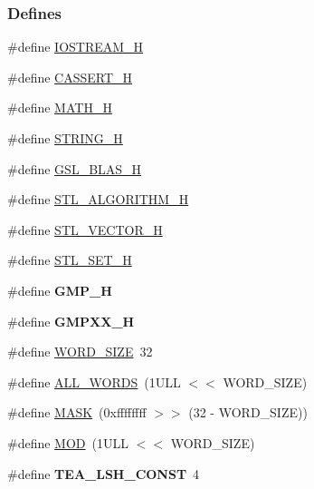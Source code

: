 \subsubsection*{\-Defines}
\begin{DoxyCompactItemize}
\item 
\#define \hyperlink{common_8hh_a438ca701b9dd1a0a50066708ccff58f9}{\-I\-O\-S\-T\-R\-E\-A\-M\-\_\-\-H}
\item 
\#define \hyperlink{common_8hh_a44300b86f203a508a89c17aa2e2c70f3}{\-C\-A\-S\-S\-E\-R\-T\-\_\-\-H}
\item 
\#define \hyperlink{common_8hh_acc195fe3f75af2725178e18f3b59ca1b}{\-M\-A\-T\-H\-\_\-\-H}
\item 
\#define \hyperlink{common_8hh_a402fe211ce26aa9a2501987dd79d1c81}{\-S\-T\-R\-I\-N\-G\-\_\-\-H}
\item 
\#define \hyperlink{common_8hh_a51650c45a5e90fb5d9808717f67bbdfc}{\-G\-S\-L\-\_\-\-B\-L\-A\-S\-\_\-\-H}
\item 
\#define \hyperlink{common_8hh_a58737f6dfc1347b3ffef3330e4b9f021}{\-S\-T\-L\-\_\-\-A\-L\-G\-O\-R\-I\-T\-H\-M\-\_\-\-H}
\item 
\#define \hyperlink{common_8hh_aaa41128916bf1510054a6b39e3be8d0c}{\-S\-T\-L\-\_\-\-V\-E\-C\-T\-O\-R\-\_\-\-H}
\item 
\#define \hyperlink{common_8hh_a419548bd7018f59158016f2a7705fe33}{\-S\-T\-L\-\_\-\-S\-E\-T\-\_\-\-H}
\item 
\hypertarget{common_8hh_aa4e25ba99abefcc6776615525b2fbc38}{\#define {\bfseries \-G\-M\-P\-\_\-\-H}}\label{common_8hh_aa4e25ba99abefcc6776615525b2fbc38}

\item 
\hypertarget{common_8hh_afd2f5d45830c97ad911a515fd5f4629b}{\#define {\bfseries \-G\-M\-P\-X\-X\-\_\-\-H}}\label{common_8hh_afd2f5d45830c97ad911a515fd5f4629b}

\item 
\#define \hyperlink{common_8hh_a92ed8507d1cd2331ad09275c5c4c1c89}{\-W\-O\-R\-D\-\_\-\-S\-I\-Z\-E}~32
\item 
\#define \hyperlink{common_8hh_a5971fc6e34c48e0046ac2df4fcb2816c}{\-A\-L\-L\-\_\-\-W\-O\-R\-D\-S}~(1\-U\-L\-L $<$$<$ W\-O\-R\-D\-\_\-\-S\-I\-Z\-E)
\item 
\#define \hyperlink{common_8hh_ae7520c5477c11965aabeedc033c9862b}{\-M\-A\-S\-K}~(0xffffffff $>$$>$ (32 -\/ W\-O\-R\-D\-\_\-\-S\-I\-Z\-E))
\item 
\#define \hyperlink{common_8hh_aca7d5718ab8c38506adb3bef2469b319}{\-M\-O\-D}~(1\-U\-L\-L $<$$<$ W\-O\-R\-D\-\_\-\-S\-I\-Z\-E)
\item 
\hypertarget{common_8hh_ac91c57ae9ace16bc26f76cbb3dd33d8b}{\#define {\bfseries \-T\-E\-A\-\_\-\-L\-S\-H\-\_\-\-C\-O\-N\-S\-T}~4}\label{common_8hh_ac91c57ae9ace16bc26f76cbb3dd33d8b}


\end{DoxyCompactItemize}
